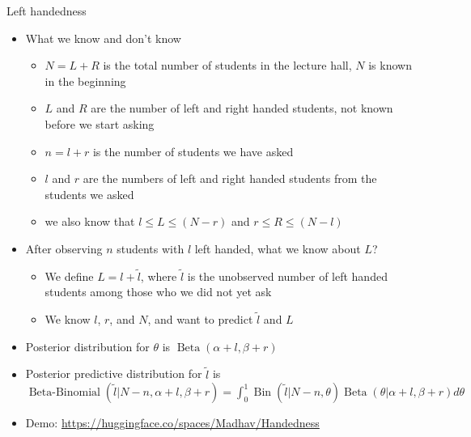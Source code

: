 \documentclass[english,t]{beamer}
\DeclareMathOperator{\Bin}{Bin}
\DeclareMathOperator{\Beta}{Beta}
\DeclareMathOperator{\BetaBinomial}{Beta-Binomial}
\begin{document}
\begin{frame}{Left handedness}

  \vspace{-0.5\baselineskip}
  \begin{itemize}
  \item What we know and don't know
    \begin{itemize}
    \item $N=L+R$ is the total number of students in the lecture hall,
      $N$ is known in the beginning
    \item $L$ and $R$ are the number of left and right handed students, not known before we start asking
    \item $n=l+r$ is the number of students we have asked
    \item $l$ and $r$ are the numbers of left and right handed students from the students we asked
    \item we also know that $l \leq L \leq (N-r)$ and $r \leq R \leq (N-l)$
    \end{itemize}
  \item After observing $n$ students with $l$ left handed, what we
    know about $L$?
    \begin{itemize}
    \item We define $L=l+\tilde{l}$, where $\tilde{l}$ is the
      unobserved number of left handed students among those who we did
      not yet ask
    \item We know $l$, $r$, and $N$, and want to predict $\tilde{l}$ and $L$
    \end{itemize}
  \item {\color{blue} Posterior} distribution for
    $\theta$ is $\Beta(\alpha+l, \beta+r)$
  \item {\color{red} Posterior predictive} distribution for
    $\displaystyle\tilde{l}$ is\\
    $\BetaBinomial(\tilde{l} | N-n, \alpha+l, \beta+r)=\int_0^1\Bin(\tilde{l} | N-n, \theta)\Beta(\theta | \alpha+l, \beta+r)d\theta$
  \item {\small Demo: \url{https://huggingface.co/spaces/Madhav/Handedness}}
  \end{itemize}
  
\end{frame}
\end{document}
